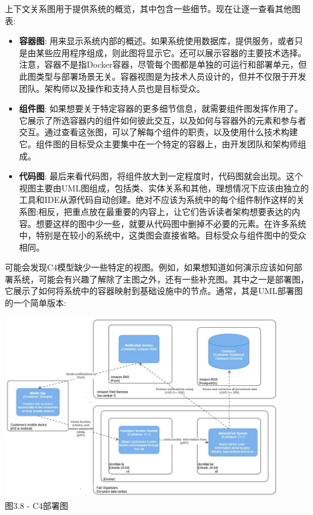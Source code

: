 上下文关系图用于提供系统的概览，其中包含一些细节。现在让逐一查看其他图表:

\begin{itemize}
\item
\textbf{容器图}: 用来显示系统内部的概述。如果系统使用数据库，提供服务，或者只是由某些应用程序组成，则此图将显示它。还可以展示容器的主要技术选择。注意，容器不是指Docker容器，尽管每个图都是单独的可运行和部署单元，但此图类型与部署场景无关。容器视图是为技术人员设计的，但并不仅限于开发团队。架构师以及操作和支持人员也是目标受众。

\item 
\textbf{组件图}: 如果想要关于特定容器的更多细节信息，就需要组件图发挥作用了。它展示了所选容器内的组件如何彼此交互，以及如何与容器外的元素和参与者交互。通过查看这张图，可以了解每个组件的职责，以及使用什么技术构建它。组件图的目标受众主要集中在一个特定的容器上，由开发团队和架构师组成。

\item
\textbf{代码图}: 最后来看代码图，将组件放大到一定程度时，代码图就会出现。这个视图主要由UML图组成，包括类、实体关系和其他，理想情况下应该由独立的工具和IDE从源代码自动创建。绝对不应该为系统中的每个组件制作这样的关系图;相反，把重点放在最重要的内容上，让它们告诉读者架构想要表达的内容。想要这样的图中少一些，就要从代码图中删掉不必要的元素。在许多系统中，特别是在较小的系统中，这类图会直接省略。目标受众与组件图中的受众相同。
\end{itemize}

可能会发现C4模型缺少一些特定的视图。例如，如果想知道如何演示应该如何部署系统，可能会有兴趣了解除了主图之外，还有一些补充图。其中之一是部署图，它展示了如何将系统中的容器映射到基础设施中的节点。通常，其是UML部署图的一个简单版本:

\begin{center}
\includegraphics[width=0.9\textwidth]{content/1/chapter3/images/8.jpg}\\
图3.8 - C4部署图
\end{center}

